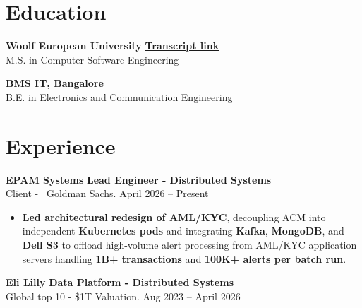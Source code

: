 \documentclass[11 pt]{article}
\begin{document}
\section*{\textbf{Education}}

\noindent
\textbf{Woolf European University} \hfill \href{https://woolf.university/id/151331132?token=eyJhbGciOiJIUzI1NiJ9.eyJpZCI6IjA5MDUyMTNjLTQxMTMtNGM2MS1hZmE3LTdkZGFiNWYyOGM5NyIsImlzcyI6InVybjpXb29sZlVuaXZlcnNpdHk6c2VydmVyL3NlcnZpY2UvYWNjZXNzIiwiaXNWZXJpZmllZCI6dHJ1ZSwia2luZCI6Im9hdXRoIiwib3JnIjp7Imdyb3VwcyI6W10sImlkIjoiOWIxN2Y1Y2UtMTA3OC00ZmRmLWFlYzAtMDJiZjRlY2ZiMGE2In0sInNjb3BlIjoiKiJ9.f-CFNfydAn-GSaAiGUkWhNAT3Yn_P7C0O7cjrRH7Eq} {\textbf{Transcript link}} \ \\
\small M.S. in Computer Software Engineering

\vspace{6pt}

\noindent\textbf{BMS IT, Bangalore}  \\
\small B.E. in Electronics and Communication Engineering

\section*{\textbf{Experience}}
\noindent
{\normalsize\textbf{EPAM Systems}} \hfill \small{\textbf{Lead Engineer - Distributed Systems}} \\
{Client - \ Goldman Sachs. \hfill April 2026 -- Present}
\begin{itemize}
\item \textbf{Led architectural redesign of AML/KYC}, decoupling ACM into independent \textbf{Kubernetes pods} and integrating \textbf{Kafka}, \textbf{MongoDB}, and \textbf{Dell S3} to offload high-volume alert processing from AML/KYC application servers handling \textbf{1B+ transactions} and \textbf{100K+ alerts per batch run}.
\end{itemize}


\vspace{6pt}

\noindent
{\normalsize\textbf{Eli Lilly}} \hfill \small{\textbf{Data Platform - Distributed Systems}} \\
{Global top 10 - \$1T Valuation. \hfill Aug 2023 -- April 2026}
\end{document}
